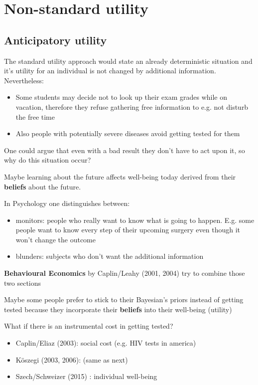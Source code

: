 
\chapter{Non-standard utility}


\section{Anticipatory utility}

The standard utility approach would state an already deterministic situation and it's utility for an individual is not changed by additional information. Nevertheless:

\begin{itemize}
	\item Some students may decide not to look up their exam grades while on vacation, therefore they refuse gathering free information to e.g. not disturb the free time
	\item Also people with potentially severe diseases avoid getting tested for them
\end{itemize}

One could argue that even with a bad result they don't have to act upon it, so why do this situation occur? 

Maybe learning about the future affects well-being today derived from their \textbf{beliefs} about the future.

In Psychology one distinguishes between:
\begin{itemize}
	\item monitors: people who really want to know what is going to happen. E.g. some people want to know every step of their upcoming surgery even though it won't change the outcome
	\item blunders: subjects who don't want the additional information
\end{itemize}


\textbf{Behavioural Economics} by Caplin/Leahy (2001, 2004) try to combine those two sections

Maybe some people prefer to stick to their Bayesian's priors instead of getting tested because they incorporate their \textbf{beliefs} into their well-being (utility)


What if there is an instrumental cost in getting tested?
\begin{itemize}
	\item Caplin/Eliaz (2003): social cost (e.g. HIV tests in america)
	\item Köszegi (2003, 2006): (same as next)
	\item Szech/Schweizer (2015) : individual well-being
\end{itemize}

